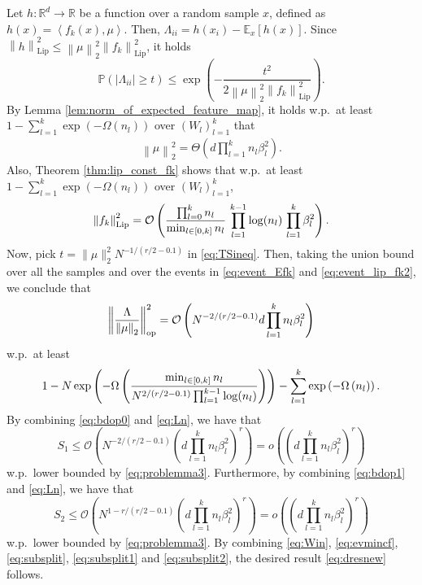 \documentclass[11pt]{article}
\newcommand{\revision}[1]{#1}
\def\RR{\mathbb{R}}
\newcommand{\littleO}[1]{o\left(#1\right)}
\newcommand{\bigO}[1]{\mathcal{O}\left(#1\right)}
\newcommand{\bigOmg}[1]{\Omega\left(#1\right)}
\newcommand{\bigTheta}[1]{\Theta\left(#1\right)}
\newcommand{\inner}[1]{\left\langle#1\right\rangle}
\newcommand{\bigexp}[1]{\exp\left(#1\right)}
\newcommand{\norm}[1]{\left\|#1\right\|}
\newcommand{\abs}[1]{\left|#1\right|}
\def\Lip{\mathrm{Lip}}
\def\PP{\mathbb{P}}
\def\min{\mathop{\rm min}\nolimits}
\begin{document}
 \revision{
Let $h:\RR^d\to\RR$ be a function over a random sample $x$, defined as $h(x)=\inner{f_k(x),\mu}.$
    Then, $\Lambda_{ii} = h(x_i)-\mathbb E_x[h(x)].$
    Since $\norm{h}_{\Lip}^2\leq\norm{\mu}_2^2\norm{f_k}_{\Lip}^2$, it holds
    \begin{equation}\label{eq:TSineq}
	\PP\left(\abs{\Lambda_{ii}}\geq t\right)
	\leq \exp\left(-\frac{t^2}{2\norm{\mu}_2^2\norm{f_k}_{\Lip}^2}\right).
    \end{equation}
    By Lemma \ref{lem:norm_of_expected_feature_map}, it holds w.p.\ at least $1 - \sum_{l=1}^k\bigexp{-\bigOmg{n_l}}$ over $(W_l)_{l=1}^k$ that
    \begin{align}\label{eq:event_Efk}
	\norm{\mu}_2^2 = \bigTheta{ d\prod_{l=1}^{k} n_l \beta_l^2 } .
    \end{align}    
   Also, Theorem \ref{thm:lip_const_fk} shows that w.p.\ at least $1-\sum_{l=1}^{k}\bigexp{-\bigOmg{n_l}}$ over $(W_l)_{l=1}^{k}$, 
    \begin{align}\label{eq:event_lip_fk2}
	\norm{f_k}_{\Lip}^2
	=\bigO{ \frac{\prod_{l=0}^k n_l}{\min_{l\in[0,k]}n_l}\, \prod_{l=1}^{k-1}\log(n_l)\, \prod_{l=1}^{k}\beta_l^2} .
    \end{align}
   Now, pick $t=\|\mu\|_2^2N^{-1/(r/2-0.1)}$ in \eqref{eq:TSineq}. Then, taking the union bound over all the samples and over the events in \eqref{eq:event_Efk} and \eqref{eq:event_lip_fk2}, we conclude that
       \begin{align}\label{eq:Ln}
	\left\|\frac{\Lambda}{\norm{\mu}_2}\right\|_{\rm op}^2=\bigO{N^{-2/(r/2-0.1)}d\prod_{l=1}^{k} n_l \beta_l^2}
    \end{align}
    w.p.\ at least 
    \begin{align*}
	1-N \bigexp{ - \bigOmg{ \frac{\min_{l\in[0,k]}n_l}{N^{2/(r/2-0.1)} \prod_{l=1}^{k-1}\log(n_l)} } }  -\sum_{l=1}^{k}\bigexp{-\bigOmg{n_l}}.
    \end{align*} 
 By combining \eqref{eq:bdop0} and \eqref{eq:Ln}, we have that
 \begin{equation}\label{eq:subsplit1}
 S_1\le \bigO{N^{-2/(r/2-0.1)}\left(d\prod_{l=1}^{k} n_l \beta_l^2\right)^r}=\littleO{ \left(d \prod_{l=1}^{k} n_l\beta_l^2\right)^r } 
 \end{equation}
        w.p.\ lower bounded by \eqref{eq:problemma3}. Furthermore, by combining \eqref{eq:bdop1} and \eqref{eq:Ln}, we have that
 \begin{equation}\label{eq:subsplit2}
 S_2\le \bigO{N^{1-r/(r/2-0.1)}\left(d\prod_{l=1}^{k} n_l \beta_l^2\right)^r}=\littleO{ \left(d \prod_{l=1}^{k} n_l\beta_l^2\right)^r } 
  \end{equation}
w.p.\ lower bounded by \eqref{eq:problemma3}. By combining \eqref{eq:Win}, \eqref{eq:evmincf}, \eqref{eq:subsplit}, \eqref{eq:subsplit1} and \eqref{eq:subsplit2}, the desired result \eqref{eq:dresnew} follows.
}
\end{document}
